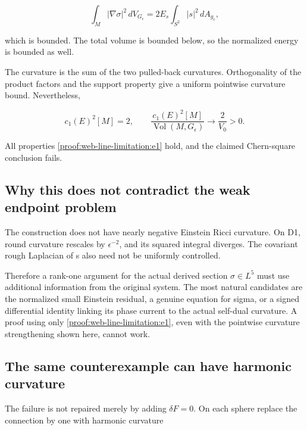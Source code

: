 \[
 \int_M|\nabla\sigma|^2\,dV_{G_\epsilon}
 =2E_s\int_{S^2}|s|^2\,dA_{g_\epsilon},
\tag{\thesection.4}\label{proof:web-line-limitation:e4}
\]

which is bounded. The total volume is bounded below, so the normalized energy is bounded as well.

The curvature is the sum of the two pulled-back curvatures. Orthogonality of the product factors and the support property give a uniform pointwise curvature bound. Nevertheless,

\[
 \boxed{c_1(E)^2[M]=2,\qquad
 \frac{c_1(E)^2[M]}{\operatorname{Vol}(M,G_\epsilon)}
 \longrightarrow\frac2{V_0}>0.}
\tag{\thesection.5}\label{proof:web-line-limitation:e5}
\]

All properties \eqref{proof:web-line-limitation:e1} hold, and the claimed Chern-square conclusion fails.

\hypertarget{proof:web-line-limitation:Why-this-does-not-contradict-the weak endpoint problem}{%
\subsection{Why this does not contradict the weak endpoint problem}\label{proof:web-line-limitation:Why-this-does-not-contradict-the weak endpoint problem}}

The construction does not have nearly negative Einstein Ricci curvature. On D1, round curvature rescales by \(\epsilon^{-2}\), and its squared integral diverges. The covariant rough Laplacian of s also need not be uniformly controlled.

Therefore a rank-one argument for the actual derived section \(\sigma\in L^5\) must use additional information from the original system. The most natural candidates are the normalized small Einstein residual, a genuine equation for sigma, or a signed differential identity linking its phase current to the actual self-dual curvature. A proof using only \eqref{proof:web-line-limitation:e1}, even with the pointwise curvature strengthening shown here, cannot work.

\hypertarget{proof:web-line-limitation:The-same-counterexample-can-have-harmonic-curvature}{%
\subsection{The same counterexample can have harmonic curvature}\label{proof:web-line-limitation:The-same-counterexample-can-have-harmonic-curvature}}

The failure is not repaired merely by adding \(\delta F=0\). On each sphere replace the connection by one with harmonic curvature

